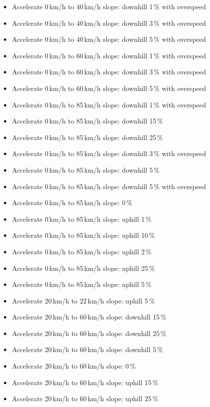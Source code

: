 \begin{itemize}
\item Accelerate 0\,km/h to 40\,km/h slope: downhill 1\,\% with overspeed
\item Accelerate 0\,km/h to 40\,km/h slope: downhill 3\,\% with overspeed
\item Accelerate 0\,km/h to 40\,km/h slope: downhill 5\,\% with overspeed
\item Accelerate 0\,km/h to 60\,km/h slope: downhill 1\,\% with overspeed
\item Accelerate 0\,km/h to 60\,km/h slope: downhill 3\,\% with overspeed
\item Accelerate 0\,km/h to 60\,km/h slope: downhill 5\,\% with overspeed
\item Accelerate 0\,km/h to 85\,km/h slope: downhill 1\,\% with overspeed
\item Accelerate 0\,km/h to 85\,km/h slope: downhill 15\,\% 
\item Accelerate 0\,km/h to 85\,km/h slope: downhill 25\,\% 
\item Accelerate 0\,km/h to 85\,km/h slope: downhill 3\,\% with overspeed
\item Accelerate 0\,km/h to 85\,km/h slope: downhill 5\,\% 
\item Accelerate 0\,km/h to 85\,km/h slope: downhill 5\,\% with overspeed
\item Accelerate 0\,km/h to 85\,km/h slope:  0\,\%
\item Accelerate 0\,km/h to 85\,km/h slope: uphill 1\,\%
\item Accelerate 0\,km/h to 85\,km/h slope: uphill 10\,\%
\item Accelerate 0\,km/h to 85\,km/h slope: uphill 2\,\%
\item Accelerate 0\,km/h to 85\,km/h slope: uphill 25\,\%
\item Accelerate 0\,km/h to 85\,km/h slope: uphill 5\,\%
\item Accelerate 20\,km/h to 22\,km/h slope: uphill 5\,\%
\item Accelerate 20\,km/h to 60\,km/h slope: downhill 15\,\%
\item Accelerate 20\,km/h to 60\,km/h slope: downhill 25\,\%
\item Accelerate 20\,km/h to 60\,km/h slope: downhill 5\,\%
\item Accelerate 20\,km/h to 60\,km/h slope:  0\,\%
\item Accelerate 20\,km/h to 60\,km/h slope: uphill 15\,\%
\item Accelerate 20\,km/h to 60\,km/h slope: uphill 25\,\%

\end{itemize}
